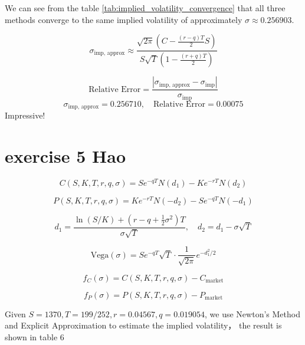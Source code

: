 \documentclass{article}
\begin{document}
We can see from the table \ref{tab:implied_volatility_convergence} that all three methods converge to the same implied volatility of approximately \( \sigma \approx 0.256903 \).

\[
    \sigma_{\text{imp, approx}} \approx
    \frac{ \sqrt{2\pi} \left( C - \frac{(r - q)T}{2} S \right) }
    { S \sqrt{T} \left( 1 - \frac{(r + q)T}{2} \right) }
\]

\[
    \text{Relative Error} =
    \frac{ \left| \sigma_{\text{imp, approx}} - \sigma_{\text{imp}} \right| }
    { \sigma_{\text{imp}} }
\]
\[
    \sigma_{\text{imp, approx}} = 0.256710, \quad
    \text{Relative Error} = 0.00075
\]
Impressive!

\section{exercise 5 Hao}
\[
    C(S, K, T, r, q, \sigma) = S e^{-qT} N(d_1) - K e^{-rT} N(d_2)
\]

\[
    P(S, K, T, r, q, \sigma) = K e^{-rT} N(-d_2) - S e^{-qT} N(-d_1)
\]

\[
    d_1 = \frac{\ln(S/K) + (r - q + \frac{1}{2}\sigma^2)T}{\sigma \sqrt{T}}, \quad
    d_2 = d_1 - \sigma \sqrt{T}
\]

\[
    \text{Vega}(\sigma) = S e^{-qT} \sqrt{T} \cdot \frac{1}{\sqrt{2\pi}} e^{-d_1^2 / 2}
\]

\[
    f_C(\sigma) = C(S, K, T, r, q, \sigma) - C_{\text{market}}
\]

\[
    f_P(\sigma) = P(S, K, T, r, q, \sigma) - P_{\text{market}}
\]

Given \(S=1370, T = 199/252, r=0.04567, q=0.019054 \), we use Newton's Method and Explicit Approximation to estimate the implied volatility， the result is shown in table 6
\end{document}
